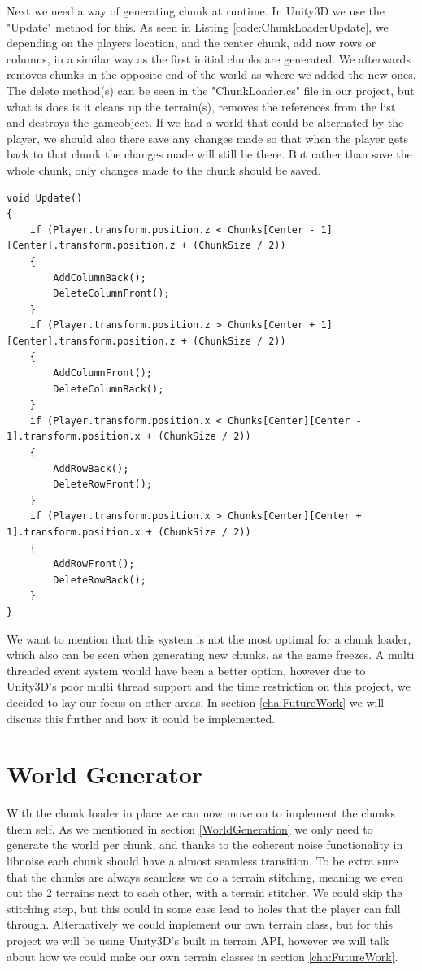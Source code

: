 Next we need a way of generating chunk at runtime. In Unity3D we use the "Update" method for this. As seen in Listing \ref{code:ChunkLoaderUpdate}, we depending on the players location, and the center chunk, add now rows or columns, in a similar way as the first initial chunks are generated. We afterwards removes chunks in the opposite end of the world as where we added the new ones. The delete method(s) can be seen in the "ChunkLoader.cs" file in our project, but what is does is it cleans up the terrain(s), removes the references from the list and destroys the gameobject. If we had a world that could be alternated by the player, we should also there save any changes made so that when the player gets back to that chunk the changes made will still be there. But rather than save the whole chunk, only changes made to the chunk should be saved.

\begin{lstlisting}[caption = The Update() method used to generate new chunks., label=code:ChunkLoaderUpdate, language=Csharp]
void Update()
{
	if (Player.transform.position.z < Chunks[Center - 1][Center].transform.position.z + (ChunkSize / 2))
	{
		AddColumnBack();
		DeleteColumnFront();
	}
	if (Player.transform.position.z > Chunks[Center + 1][Center].transform.position.z + (ChunkSize / 2))
	{
		AddColumnFront();
		DeleteColumnBack();
	}
	if (Player.transform.position.x < Chunks[Center][Center - 1].transform.position.x + (ChunkSize / 2))
	{
		AddRowBack();
		DeleteRowFront();
	}
	if (Player.transform.position.x > Chunks[Center][Center + 1].transform.position.x + (ChunkSize / 2))
	{
		AddRowFront();
		DeleteRowBack();
	}
}
\end{lstlisting}

We want to mention that this system is not the most optimal for a chunk loader, which also can be seen when generating new chunks, as the game freezes. A multi threaded event system would have been a better option, however due to Unity3D's poor multi thread support and the time restriction on this project, we decided to lay our focus on other areas. In section \ref{cha:FutureWork} we will discuss this further and how it could be implemented.


\section{World Generator}
\label{WorldGenerator}

With the chunk loader in place we can now move on to implement the chunks them self. As we mentioned in section \ref{WorldGeneration} we only need to generate the world per chunk, and thanks to the coherent noise functionality in libnoise each chunk should have a almost seamless transition. To be extra sure that the chunks are always seamless we do a terrain stitching, meaning we even out the 2 terrains next to each other, with a terrain stitcher. We could skip the stitching step, but this could in some case lead to holes that the player can fall through. Alternatively we could implement our own terrain class, but for this project we will be using Unity3D's built in terrain API, however we will talk about how we could make our own terrain classes in section \ref{cha:FutureWork}.

